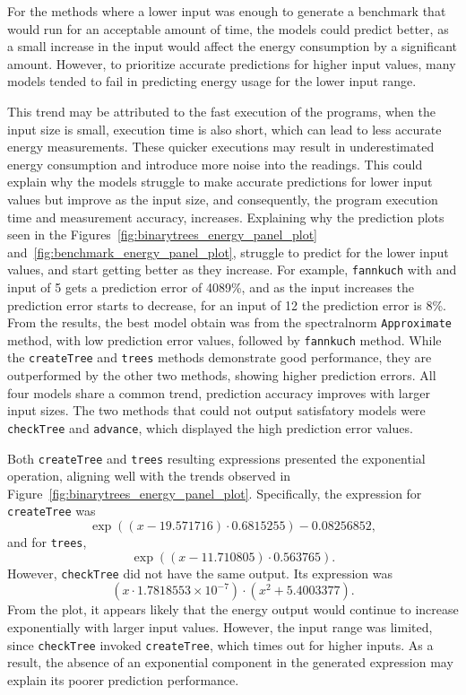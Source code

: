 For the methods where a lower input was enough to generate a benchmark that would run for an acceptable amount of time, the models could predict better, as a small increase in the input would affect the energy consumption by a significant amount. However, to prioritize accurate predictions for higher input values, many models tended to fail in predicting energy usage for the lower input range. 

This trend may be attributed to the fast execution of the programs, when the input size is small, execution time is also short, which can lead to less accurate energy measurements. These quicker executions may result in underestimated energy consumption and introduce more noise into the readings. This could explain why the models struggle to make accurate predictions for lower input values but improve as the input size, and consequently, the program execution time and measurement accuracy, increases. Explaining why the prediction plots seen in the Figures~\ref{fig:binarytrees_energy_panel_plot} and~\ref{fig:benchmark_energy_panel_plot}, struggle to predict for the lower input values, and start getting better as they increase. For example, \texttt{fannkuch} with and input of 5 gets a prediction error of 4089\%, and as the input increases the prediction error starts to decrease, for an input of 12 the prediction error is 8\%.
From the results, the best model obtain was from the spectralnorm \texttt{Approximate} method, with low prediction error values, followed by \texttt{fannkuch} method. While the \texttt{createTree} and \texttt{trees} methods demonstrate good performance, they are outperformed by the other two methods, showing higher prediction errors. All four models share a common trend, prediction accuracy improves with larger input sizes. The two methods that could not output satisfatory models were \texttt{checkTree} and \texttt{advance}, which displayed the high prediction error values.

Both \texttt{createTree} and \texttt{trees} resulting expressions presented the exponential operation, aligning well with the trends observed in Figure~\ref{fig:binarytrees_energy_panel_plot}. Specifically, the expression for \texttt{createTree} was  
\[
\exp\left((x - 19.571716) \cdot 0.6815255\right) - 0.08256852,
\]  
and for \texttt{trees},  
\[
\exp\left((x - 11.710805) \cdot 0.563765\right).
\]  
However, \texttt{checkTree} did not have the same output. Its expression was  
\[
(x \cdot 1.7818553 \times 10^{-7}) \cdot \left(x^2 + 5.4003377\right).
\]  
From the plot, it appears likely that the energy output would continue to increase exponentially with larger input values. However, the input range was limited, since \texttt{checkTree} invoked \texttt{createTree}, which times out for higher inputs. As a result, the absence of an exponential component in the generated expression may explain its poorer prediction performance.

